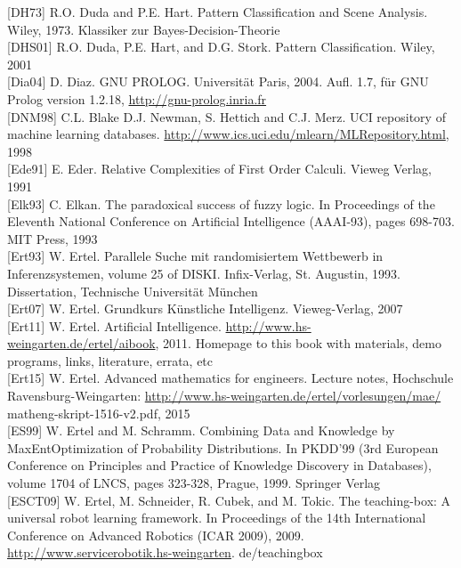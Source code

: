 \documentclass[10pt]{article}
\begin{document}
[DH73] R.O. Duda and P.E. Hart. Pattern Classification and Scene Analysis. Wiley, 1973. Klassiker zur Bayes-Decision-Theorie\\[0pt]
[DHS01] R.O. Duda, P.E. Hart, and D.G. Stork. Pattern Classification. Wiley, 2001\\[0pt]
[Dia04] D. Diaz. GNU PROLOG. Universität Paris, 2004. Aufl. 1.7, für GNU Prolog version 1.2.18, \href{http://gnu-prolog.inria.fr}{http://gnu-prolog.inria.fr}\\[0pt]
[DNM98] C.L. Blake D.J. Newman, S. Hettich and C.J. Merz. UCI repository of machine learning databases. \href{http://www.ics.uci.edu/mlearn/MLRepository.html}{http://www.ics.uci.edu/mlearn/MLRepository.html}, 1998\\[0pt]
[Ede91] E. Eder. Relative Complexities of First Order Calculi. Vieweg Verlag, 1991\\[0pt]
[Elk93] C. Elkan. The paradoxical success of fuzzy logic. In Proceedings of the Eleventh National Conference on Artificial Intelligence (AAAI-93), pages 698-703. MIT Press, 1993\\[0pt]
[Ert93] W. Ertel. Parallele Suche mit randomisiertem Wettbewerb in Inferenzsystemen, volume 25 of DISKI. Infix-Verlag, St. Augustin, 1993. Dissertation, Technische Universität München\\[0pt]
[Ert07] W. Ertel. Grundkurs Künstliche Intelligenz. Vieweg-Verlag, 2007\\[0pt]
[Ert11] W. Ertel. Artificial Intelligence. \href{http://www.hs-weingarten.de/ertel/aibook}{http://www.hs-weingarten.de/ertel/aibook}, 2011. Homepage to this book with materials, demo programs, links, literature, errata, etc\\[0pt]
[Ert15] W. Ertel. Advanced mathematics for engineers. Lecture notes, Hochschule Ravensburg-Weingarten: \href{http://www.hs-weingarten.de/ertel/vorlesungen/mae/}{http://www.hs-weingarten.de/ertel/vorlesungen/mae/} matheng-skript-1516-v2.pdf, 2015\\[0pt]
[ES99] W. Ertel and M. Schramm. Combining Data and Knowledge by MaxEntOptimization of Probability Distributions. In PKDD'99 (3rd European Conference on Principles and Practice of Knowledge Discovery in Databases), volume 1704 of LNCS, pages 323-328, Prague, 1999. Springer Verlag\\[0pt]
[ESCT09] W. Ertel, M. Schneider, R. Cubek, and M. Tokic. The teaching-box: A universal robot learning framework. In Proceedings of the 14th International Conference on Advanced Robotics (ICAR 2009), 2009. \href{http://www.servicerobotik.hs-weingarten}{http://www.servicerobotik.hs-weingarten}. de/teachingbox\\[0pt]
\end{document}

